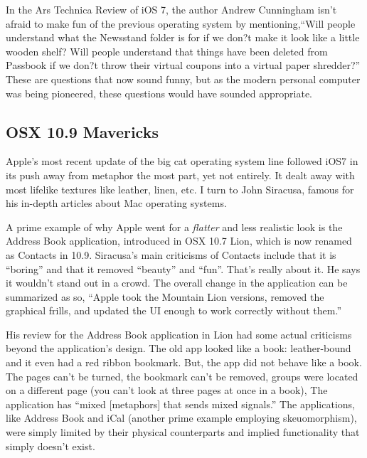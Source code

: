 \documentclass[11pt, oneside]{article}   	%
\begin{document}
In the Ars Technica Review of iOS 7, the author Andrew Cunningham isn't afraid to make fun of the previous operating system by mentioning,``Will people understand what the Newsstand folder is for if we don?t make it look like a little wooden shelf? Will people understand that things have been deleted from Passbook if we don?t throw their virtual coupons into a virtual paper shredder?'' \cite{ars-technica-iOS7} These are questions that now sound funny, but as the modern personal computer was being pioneered, these questions would have sounded appropriate.

\subsection{OSX 10.9 Mavericks}
Apple's most recent update of the big cat operating system line followed iOS7 in its push away from metaphor the most part, yet not entirely. It dealt away with most lifelike textures like leather, linen, etc. I turn to John Siracusa, famous for his in-depth articles about Mac operating systems.

A prime example of why Apple went for a \textit{flatter} and less realistic look is the Address Book application, introduced in OSX 10.7 Lion, which is now renamed as Contacts in 10.9. Siracusa's main criticisms of Contacts include that it is ``boring'' and that it removed ``beauty'' and ``fun''.  \cite{ars-technica-mavericks} That's really about it. He says it wouldn't stand out in a crowd. The overall change in the application can be summarized as so, ``Apple took the Mountain Lion versions, removed the graphical frills, and updated the UI enough to work correctly without them.'' \cite{ars-technica-mavericks} 

His review for the Address Book application in Lion had some actual criticisms beyond the application's design. The old app looked like a book: leather-bound and it even had a red ribbon bookmark. But, the app did not behave like a book. The pages can't be turned, the bookmark can't be removed, groups were located on a different page (you can't look at three pages at once in a book), \cite{ars-technica-lion} The application has ``mixed [metaphors] that sends mixed signals.''  The applications, like Address Book and iCal (another prime example employing skeuomorphism), were simply limited by their physical counterparts and implied functionality that simply doesn't exist. \cite{ars-technica-lion}
\end{document}
